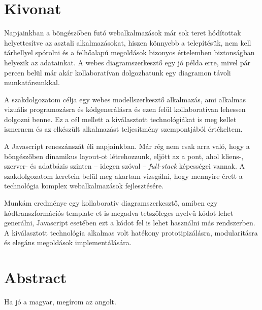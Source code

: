 \chapter*{Kivonat}

Napjainkban a böngészőben futó webalkalmazások már sok teret hódítottak helyettesítve az asztali alkalmazásokat, hiszen könnyebb a telepítésük, nem kell tárhellyel spórolni és a felhőalapú megoldások bizonyos értelemben biztonságban helyezik az adatainkat. A webes diagramszerkesztő egy jó példa erre, mivel pár percen belül már akár kollaboratívan dolgozhatunk egy diagramon távoli munkatársunkkal.

A szakdolgozatom célja egy webes modellszerkesztő alkalmazás, ami alkalmas vizuális programozásra és kódgenerálásra és ezen felül kollaboratívan lehessen dolgozni benne. Ez a cél mellett a kiválasztott technológiákat is meg kellet ismernem és az elkészült alkalmazást teljesítmény szempontjából értékeltem.

A Javascript reneszánszát éli napjainkban. Már rég nem csak arra való, hogy a böngészőben dinamikus layout-ot létrehozzunk, eljött az a pont, ahol kliens-, szerver- és adatbázis szinten -- idegen szóval -- \emph{full-stack} képességei vannak. A szakdolgozatom keretein belül meg akartam vizsgálni, hogy mennyire érett a technológia komplex webalkalmazások fejlesztésére. 

Munkám eredménye egy kollaboratív diagramszerkesztő, amiben egy kódtranszformációs template-et is megadva tetszőleges nyelvű kódot lehet generálni, Javascript esetében ezt a kódot fel is lehet használni más rendszerben. A kiválasztott technológia alkalmas volt hatékony prototipizálásra, modularitásra és elegáns megoldások implementálására.  

\vfill

\chapter*{Abstract}

Ha jó a magyar, megírom az angolt.
\vfill

